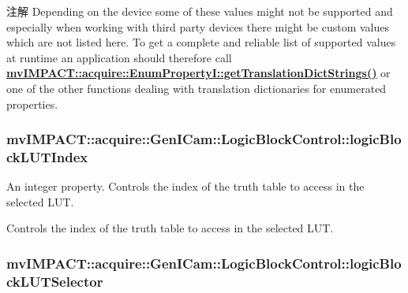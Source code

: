 \begin{DoxyNote}{注解}
Depending on the device some of these values might not be supported and especially when working with third party devices there might be custom values which are not listed here. To get a complete and reliable list of supported values at runtime an application should therefore call {\bfseries \hyperlink{classmv_i_m_p_a_c_t_1_1acquire_1_1_enum_property_i_a0ba6ccbf5ee69784d5d0b537924d26b6}{mv\+I\+M\+P\+A\+C\+T\+::acquire\+::\+Enum\+Property\+I\+::get\+Translation\+Dict\+Strings()}} or one of the other functions dealing with translation dictionaries for enumerated properties. 
\end{DoxyNote}
\hypertarget{classmv_i_m_p_a_c_t_1_1acquire_1_1_gen_i_cam_1_1_logic_block_control_aa2c324debca392820962c6094443d1eb}{
\subsubsection[{logic\+Block\+L\+U\+T\+Index}]{ mv\+I\+M\+P\+A\+C\+T\+::acquire\+::\+Gen\+I\+Cam\+::\+Logic\+Block\+Control\+::logic\+Block\+L\+U\+T\+Index}}\label{classmv_i_m_p_a_c_t_1_1acquire_1_1_gen_i_cam_1_1_logic_block_control_aa2c324debca392820962c6094443d1eb}


An integer property. Controls the index of the truth table to access in the selected L\+U\+T. 

Controls the index of the truth table to access in the selected L\+U\+T. \hypertarget{classmv_i_m_p_a_c_t_1_1acquire_1_1_gen_i_cam_1_1_logic_block_control_a21158971017be39ba75a86ac4ebe8d52}{
\subsubsection[{logic\+Block\+L\+U\+T\+Selector}]{ mv\+I\+M\+P\+A\+C\+T\+::acquire\+::\+Gen\+I\+Cam\+::\+Logic\+Block\+Control\+::logic\+Block\+L\+U\+T\+Selector}}\label{classmv_i_m_p_a_c_t_1_1acquire_1_1_gen_i_cam_1_1_logic_block_control_a21158971017be39ba75a86ac4ebe8d52}


